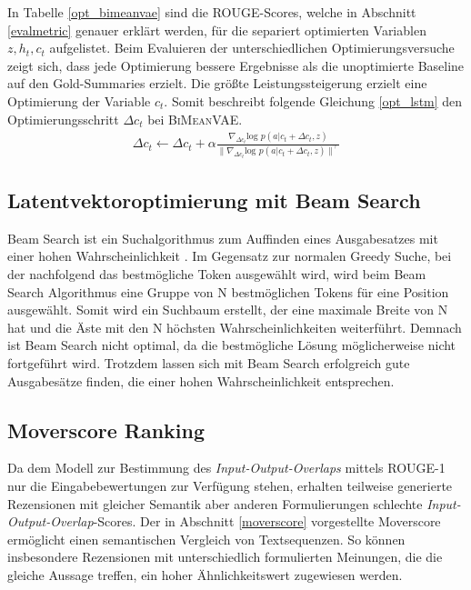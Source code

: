 In Tabelle \ref{opt_bimeanvae} sind die ROUGE-Scores, welche in Abschnitt \ref*{evalmetric} genauer erklärt werden, für die separiert optimierten Variablen $z, h_t, c_t$ aufgelistet.
Beim Evaluieren der unterschiedlichen Optimierungsversuche zeigt sich, dass jede Optimierung bessere Ergebnisse als die unoptimierte Baseline auf den Gold-Summaries erzielt.
Die größte Leistungssteigerung erzielt eine Optimierung der Variable $c_t$.
Somit beschreibt folgende Gleichung \ref{opt_lstm} den Optimierungsschritt $\Delta c_t$ bei \textsc{BiMeanVAE}.
\begin{align}
    \Delta c_t \leftarrow \Delta c_t + \alpha \frac{\nabla_{\Delta c_t} \text{log }p(a|c_t+\Delta c_t,z)}{\| \nabla_{\Delta c_t} \text{log }p(a|c_t +\Delta c_t ,z )\|^\gamma} \label{opt_lstm}
\end{align}


\pagebreak %
\subsection{Latentvektoroptimierung mit Beam Search}
Beam Search ist ein Suchalgorithmus zum Auffinden eines Ausgabesatzes mit einer hohen Wahrscheinlichkeit \citep{DBLP:journals/corr/abs-1903-06059}. 
Im Gegensatz zur normalen Greedy Suche, bei der nachfolgend das bestmögliche Token ausgewählt wird, wird beim Beam Search Algorithmus eine Gruppe von N bestmöglichen Tokens für eine Position ausgewählt. 
Somit wird ein Suchbaum erstellt, der eine maximale Breite von N hat und die Äste mit den N höchsten Wahrscheinlichkeiten weiterführt. 
Demnach ist Beam Search nicht optimal, da die bestmögliche Lösung möglicherweise nicht fortgeführt wird. Trotzdem lassen sich mit Beam Search erfolgreich gute Ausgabesätze finden, die einer hohen Wahrscheinlichkeit entsprechen.

\subsection{Moverscore Ranking}
\label{moverscore_ranking}
Da dem Modell zur Bestimmung des \textit{Input-Output-Overlaps} mittels ROUGE-1 nur die Eingabebewertungen zur Verfügung stehen, erhalten teilweise generierte Rezensionen mit gleicher Semantik aber anderen Formulierungen schlechte  \textit{Input-Output-Overlap}-Scores.
Der in Abschnitt \ref{moverscore} vorgestellte Moverscore ermöglicht einen semantischen Vergleich von Textsequenzen. 
So können insbesondere Rezensionen mit unterschiedlich formulierten Meinungen, die die gleiche Aussage treffen, ein hoher Ähnlichkeitswert zugewiesen werden.

